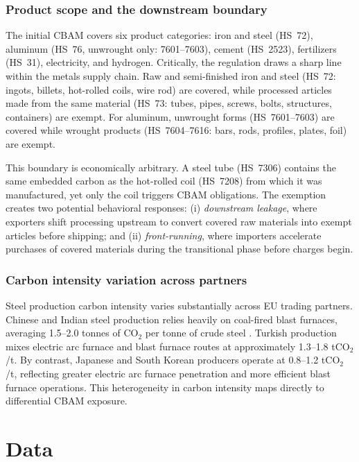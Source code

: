 \documentclass[12pt]{article}
\begin{document}
\subsubsection*{Product scope and the downstream boundary} The initial CBAM covers six product categories: iron and steel (HS~72), aluminum (HS~76, unwrought only: 7601--7603), cement (HS~2523), fertilizers (HS~31), electricity, and hydrogen. Critically, the regulation draws a sharp line within the metals supply chain. Raw and semi-finished iron and steel (HS~72: ingots, billets, hot-rolled coils, wire rod) are covered, while processed articles made from the same material (HS~73: tubes, pipes, screws, bolts, structures, containers) are exempt. For aluminum, unwrought forms (HS~7601--7603) are covered while wrought products (HS~7604--7616: bars, rods, profiles, plates, foil) are exempt.

This boundary is economically arbitrary. A steel tube (HS~7306) contains the same embedded carbon as the hot-rolled coil (HS~7208) from which it was manufactured, yet only the coil triggers CBAM obligations. The exemption creates two potential behavioral responses: (i) \emph{downstream leakage}, where exporters shift processing upstream to convert covered raw materials into exempt articles before shipping; and (ii) \emph{front-running}, where importers accelerate purchases of covered materials during the transitional phase before charges begin.

\subsubsection*{Carbon intensity variation across partners} Steel production carbon intensity varies substantially across EU trading partners. Chinese and Indian steel production relies heavily on coal-fired blast furnaces, averaging 1.5--2.0 tonnes of CO$_2$ per tonne of crude steel \citep{worldsteel_2023}. Turkish production mixes electric arc furnace and blast furnace routes at approximately 1.3--1.8 tCO$_2$/t. By contrast, Japanese and South Korean producers operate at 0.8--1.2 tCO$_2$/t, reflecting greater electric arc furnace penetration and more efficient blast furnace operations. This heterogeneity in carbon intensity maps directly to differential CBAM exposure.


\section{Data}
\label{sec:data}
\end{document}
